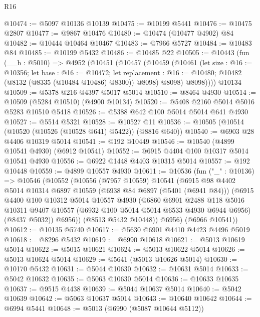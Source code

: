 \begin{lexlean}{R16}
\begin{coremodule}
@10474 := @5097 @10136 @10139
@10475 := @10199 @5441
@10476 := @10475 @2807
@10477 := @9867 @10476
@10480 := @10474 (@10477 @4902) @84
@10482 := @10444 @10464 @10467
@10483 := @7966 @5727
@10484 := @10483 @84
@10485 := @10199 @5432
@10486 := @10485 @22
@10505 := @10443
    (fun (__b : @5010) =>
    @4952
      (@10451
        (@10457
          (@10459
            (@10461
              (let size : @16 := @10356;
              let base : @16 := @10472;
              let replacement : @16 := @10480; @10482 (@8132 (@8335 (@10484 @10486) @8300)) @8098)
              @8098)
            @8098))))
    @10134
@10509 := @5378 @216 @4397 @5017 @5014
@10510 := @8464 @4930
@10514 := @10509 (@5284 @10510) (@4900 @10134)
@10520 := @5408 @2160 @5014 @5016 @5283 @10510 @5418
@10526 := @5388 @642 @100 @5014 @5014 @641 @4930
@10527 := @5514 @5321
@10528 := @10527 @11
@10536 := @10505 (@10514 (@10520 (@10526 (@10528 @641) @5422)) (@8816 @640))
@10540 := @6903 @28 @4406 @10319 @5014
@10541 := @192 @10449
@10546 := @10540 (@4899 @10541 @4930) (@6912 @10541)
@10552 := @6915 @4404 @100 @10317 @5014 @10541 @4930
@10556 := @6922 @1448 @4403 @10315 @5014
@10557 := @192 @10448
@10559 := @4899 @10557 @4930
@10611 := @10536
    (fun ("_" : @10136) =>
    @10546
      (@10552
        (@10556
          (@7957 @10559)
          @10541
          (@6915
            @98
            @4402
            @5014
            @10314
            @6897
            @10559
            (@6938 @84 @6897 (@5401 (@6941 @84)))
            (@6915
              @4400
              @100
              @10312
              @5014
              @10557
              @4930
              (@6860
                @6901
                @2488
                @118
                @5016
                @10311
                @9407
                @10557
                (@6932 @100 @5014 @5014 @6533 @4930 @6944 @6956)
                (@8437 @5032))
              @6956))
          (@8513 @5432 @10448))
        @6956)
      (@6966 @10541))
@10612 := @10135 @5740
@10617 := @5630 @6901 @4410 @4423 @4496 @5019
@10618 := @8296 @5432
@10619 := @6990 @10618
@10621 := @5013 @10619 @5014
@10622 := @5015 @10621
@10624 := @5013 @10622 @5014
@10626 := @5013 @10624 @5014
@10629 := @5641 (@5013 @10626 @5014)
@10630 := @10170 @5432
@10631 := @5044 @10630
@10632 := @10631 @5014
@10633 := @5042 @10632
@10635 := @5063 @10630 @5014
@10636 := @10633 @10635
@10637 := @9515 @4438
@10639 := @5044 @10637 @5014
@10640 := @5042 @10639
@10642 := @5063 @10637 @5014
@10643 := @10640 @10642
@10644 := @6994 @5441
@10648 := @5013 (@6990 (@5087 @10644 @5112))

\end{coremodule}
\end{lexlean}
